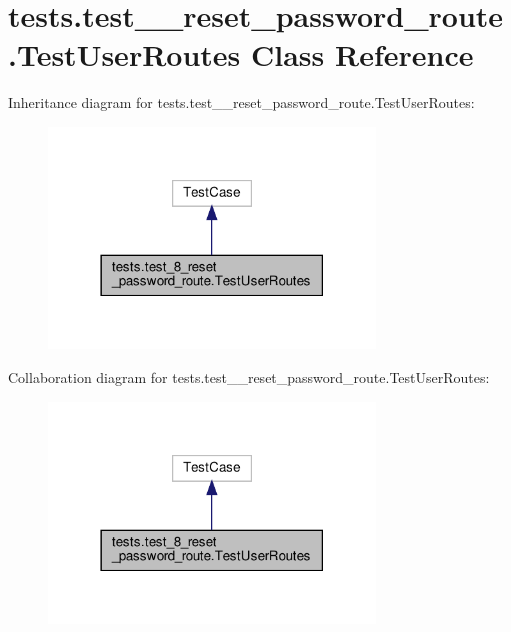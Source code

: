 \hypertarget{classtests_1_1test__8__reset__password__route_1_1_test_user_routes}{}\section{tests.\+test\+\_\+\_\+reset\+\_\+password\+\_\+route.\+Test\+User\+Routes Class Reference}
\label{classtests_1_1test__8__reset__password__route_1_1_test_user_routes}


Inheritance diagram for tests.\+test\+\_\+\_\+reset\+\_\+password\+\_\+route.\+Test\+User\+Routes\+:
\nopagebreak
\begin{figure}[H]
\begin{center}
\leavevmode
\includegraphics[width=246pt]{classtests_1_1test__8__reset__password__route_1_1_test_user_routes__inherit__graph}
\end{center}
\end{figure}


Collaboration diagram for tests.\+test\+\_\+\_\+reset\+\_\+password\+\_\+route.\+Test\+User\+Routes\+:
\nopagebreak
\begin{figure}[H]
\begin{center}
\leavevmode
\includegraphics[width=246pt]{classtests_1_1test__8__reset__password__route_1_1_test_user_routes__coll__graph}
\end{center}
\end{figure}
